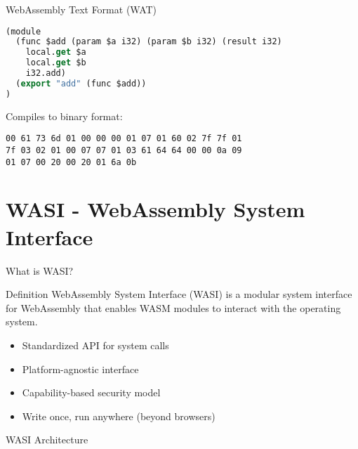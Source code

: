 \documentclass[11pt,aspectratio=169]{beamer}
\begin{document}
\begin{frame}[fragile]{WebAssembly Text Format (WAT)}
\begin{lstlisting}[language=Lisp]
(module
  (func $add (param $a i32) (param $b i32) (result i32)
    local.get $a
    local.get $b
    i32.add)
  (export "add" (func $add))
)
\end{lstlisting}

Compiles to binary format:
\begin{lstlisting}
00 61 73 6d 01 00 00 00 01 07 01 60 02 7f 7f 01
7f 03 02 01 00 07 07 01 03 61 64 64 00 00 0a 09
01 07 00 20 00 20 01 6a 0b
\end{lstlisting}
\end{frame}

\section{WASI - WebAssembly System Interface}

\begin{frame}{What is WASI?}
\begin{block}{Definition}
WebAssembly System Interface (WASI) is a modular system interface for WebAssembly that enables WASM modules to interact with the operating system.
\end{block}

\begin{itemize}
    \item Standardized API for system calls
    \item Platform-agnostic interface
    \item Capability-based security model
    \item Write once, run anywhere (beyond browsers)
\end{itemize}
\end{frame}

\begin{frame}{WASI Architecture}
\begin{center}
\end{center}
\end{frame}
\end{document}
